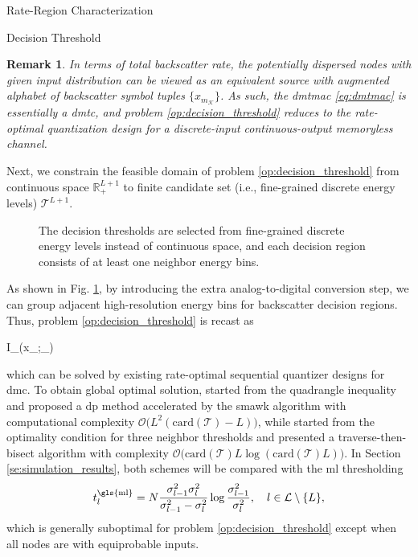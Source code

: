 \documentclass[journal]{IEEEtran}
\newtheorem{remark}{Remark}
\begin{document}
\begin{section}{Rate-Region Characterization}
\begin{subsection}{Decision Threshold}
		\begin{remark}
			In terms of total backscatter rate, the potentially dispersed nodes with given input distribution can be viewed as an equivalent source with augmented alphabet of backscatter symbol tuples $\{x_{m_{\mathcal{K}}}\}$.
			As such, the \gls{dmtmac} \eqref{eq:dmtmac} is essentially a \gls{dmtc}, and problem \eqref{op:decision_threshold} reduces to the rate-optimal quantization design for a discrete-input continuous-output memoryless channel.
			\label{re:augmented_source}
		\end{remark}

		Next, we constrain the feasible domain of problem \eqref{op:decision_threshold} from continuous space $\mathbb{R}_+^{L+1}$ to finite candidate set (i.e., fine-grained discrete energy levels) $\mathcal{T}^{L+1}$.
		\begin{figure}[!t]
			\centering
			\resizebox{0.9\columnwidth}{!}{
				
			}
			\caption{The decision thresholds are selected from fine-grained discrete energy levels instead of continuous space, and each decision region consists of at least one neighbor energy bins.}
			\label{fi:discrete_outputs}
		\end{figure}
		As shown in Fig. \ref{fi:discrete_outputs}, by introducing the extra analog-to-digital conversion step, we can group adjacent high-resolution energy bins for backscatter decision regions.
		Thus, problem \eqref{op:decision_threshold} is recast as
		\begin{maxi!}
			{}{I_{}(x_{};_{})}{\label{op:decision_threshold_discrete}}{\label{ob:decision_threshold_discrete}}
			\addConstraint{\eqref{co:sequential_threshold},}
		\end{maxi!}
		which can be solved by existing rate-optimal sequential quantizer designs for \gls{dmc}.
		To obtain global optimal solution, \cite{He2021} started from the quadrangle inequality and proposed a \gls{dp} method accelerated by the \gls{smawk} algorithm with computational complexity $\mathcal{O}\bigl(L^2(\mathrm{card}(\mathcal{T})-L)\bigr)$, while \cite{Nguyen2020a} started from the optimality condition for three neighbor thresholds and presented a traverse-then-bisect algorithm with complexity $\mathcal{O}\bigl(\mathrm{card}(\mathcal{T})L\log(\mathrm{card}(\mathcal{T})L)\bigr)$.
		In Section \ref{se:simulation_results}, both schemes will be compared with the \gls{ml} thresholding \cite{Qian2019}
		\begin{equation}
			t_{l}^{\mathrm{\gls{ml}}} = N \frac{\sigma_{l-1}^2 \sigma_{l}^2}{\sigma_{l-1}^2 - \sigma_{l}^2} \log \frac{\sigma_{l-1}^2}{\sigma_{l}^2}, \quad l \in \mathcal{L} \setminus \{L\},
			\label{eq:detection_threshold_maximum_likelihood}
		\end{equation}
		which is generally suboptimal for problem \eqref{op:decision_threshold} except when all nodes are with equiprobable inputs.
	\end{subsection}
\end{section}
\end{document}
